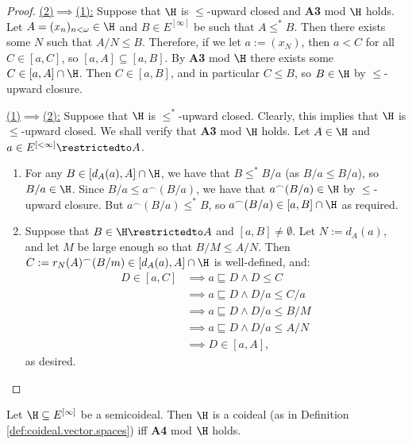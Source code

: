 \documentclass[11pt,reqno]{amsart}
\begin{document}
\begin{proof}
    \underline{(2)$\implies$(1):} Suppose that $\H$ is $\leq$-upward closed and \textbf{A3} mod $\H$ holds. Let $A = (x_n)_{n<\omega} \in \H$ and $B \in E^{[\infty]}$ be such that $A \leq^* B$. Then there exists some $N$ such that $A/N \leq B$. Therefore, if we let $a := (x_N)$, then $a < C$ for all $C \in [a,C]$, so $[a,A] \subseteq [a,B]$. By \textbf{A3} mod $\H$ there exists some $C \in [a,A] \cap \H$. Then $C \in [a,B]$, and in particular $C \leq B$, so $B \in \H$ by $\leq$-upward closure. 
    
    \underline{(1)$\implies$(2):} Suppose that $\H$ is $\leq^*$-upward closed. Clearly, this implies that $\H$ is $\leq$-upward closed. We shall verify that \textbf{A3} mod $\H$ holds. Let $A \in \H$ and $a \in E^{[<\infty]}\restrictedto A$.
    \begin{enumerate}[label=(\alph*)]
        \item For any $B \in [d_A(a),A] \cap \H$, we have that $B \leq^* B/a$ (as $B/a \leq B/a$), so $B/a \in \H$. Since $B/a \leq a^\frown(B/a)$, we have that $a^\frown(B/a) \in \H$ by $\leq$-upward closure. But $a^\frown(B/a) \leq^* B$, so $a^\frown(B/a) \in [a,B] \cap \H$ as required.

        \item Suppose that $B \in \H\restrictedto A$ and $[a,B] \neq \emptyset$. Let $N := d_A(a)$, and let $M$ be large enough so that $B/M \leq A/N$. Then $C := r_N(A)^\frown(B/m) \in [d_A(a),A] \cap \H$ is well-defined, and:
        \begin{align*}
            D \in [a,C] &\implies a \sqsubseteq D \wedge D \leq C \\
            &\implies a \sqsubseteq D \wedge D/a \leq C/a \\
            &\implies a \sqsubseteq D \wedge D/a \leq B/M \\
            &\implies a \sqsubseteq D \wedge D/a \leq A/N \\
            &\implies D \in [a,A], 
        \end{align*}
        as desired.
    \end{enumerate}
\end{proof}

\begin{lemma}
    Let $\H \subseteq E^{[\infty]}$ be a semicoideal. Then $\H$ is a coideal (as in Definition \ref{def:coideal.vector.spaces}) iff \textbf{A4} mod $\H$ holds.
\end{lemma}
\end{document}
